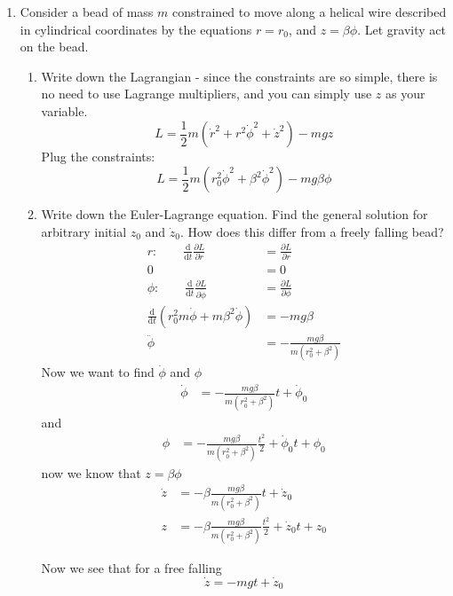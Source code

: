 \documentclass{article}
\newcommand{\de}{\mathrm{d}}
\begin{document}
\begin{enumerate}
\begin{enumerate}
    \end{enumerate}
    \item Consider a bead of mass $m$ constrained to move along a helical wire described in cylindrical coordinates by the equations $r = r_0$, and $z = \beta \phi$. Let gravity act on the bead.
    \begin{enumerate}
        \item Write down the Lagrangian - since the constraints are so simple, there is no need to use Lagrange multipliers, and you can simply use $z$ as your variable.\\

        \[
        L = \frac{1}{2}m(\dot r^2 + r^2 \dot \phi^2 + \dot z^2) - mgz
        \]
        Plug the constraints:
        \[
        L = \frac{1}{2}m(r_0^2 \dot \phi^2 + \beta^2\dot \phi^2) - mg\beta\phi
        \]
        \item Write down the Euler-Lagrange equation. Find the general solution for arbitrary initial $z_0$ and $\dot z_0$. How does this differ from a freely falling bead?\\

        \begin{align*}
            r: \qquad \frac{\de}{\de t}\frac{\partial L}{\partial \dot r} &= \frac{\partial L}{\partial r}\\
                      0 &= 0\\
            \phi: \qquad \frac{\de}{\de t}\frac{\partial L}{\partial \dot \phi} &= \frac{\partial L}{\partial \phi}\\
                        \frac{\de}{\de t}(r_0^2m\dot \phi + m\beta^2 \dot \phi) &= -mg\beta\\
                        \ddot \phi &= -\frac{mg\beta}{m(r_0^2+\beta^2)}
        \end{align*}
        Now we want to find $\dot \phi$ and $\phi$
        \begin{align*}
            \dot \phi &= -\frac{mg\beta}{m(r_0^2+\beta^2)}t + \dot \phi_0
        \end{align*}
        and
        \begin{align*}
            \phi &= -\frac{mg\beta}{m(r_0^2+\beta^2)} \frac{t^2}{2} + \dot \phi_0t + \phi_0
        \end{align*}
        now we know that $z = \beta \phi$
        \begin{align*}
            \dot z &= -\beta\frac{mg\beta}{m(r_0^2+\beta^2)}t + \dot z_0 \\
            z &= -\beta\frac{mg\beta}{m(r_0^2+\beta^2)} \frac{t^2}{2} + \dot z_0t + z_0
        \end{align*}

        Now we see that for a free falling
        \[
            \dot z = -mgt + \dot z_0
        \]




    \end{enumerate}
\end{enumerate}
















\end{document}

